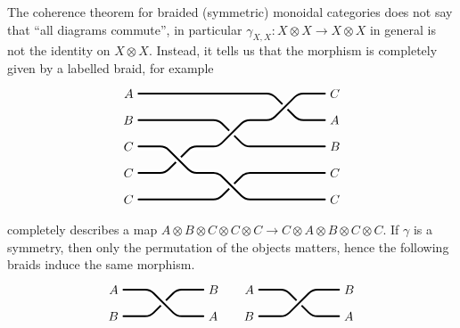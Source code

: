 \documentclass[a4paper,11pt,oneside,openany]{scrbook}
\begin{document}
\begin{rmk}
	The coherence theorem for braided (symmetric) monoidal categories does not say that ``all diagrams commute'', in particular $\gamma_{X,X}\colon X\otimes X\rightarrow X\otimes X$ in general is not the identity on $X\otimes X$. Instead, it tells us that the morphism is completely given by a labelled braid, for example
	\[
		\begin{tikzpicture}
			\draw[line width=0.5mm, cap=round, rounded corners] (0,3) -- node[pos=0, left] {$A$} (3.75,3) -- (4.5,2.25) -- (5.25,2.25) node[pos=1, right] {$A$}; %
			\draw[line width=0.5mm, cap=round, rounded corners] (0,2.25) -- node[pos=0, left] {$B$} (2.25,2.25) -- (3,1.5) -- (5.25,1.5) node[pos=1, right] {$B$}; %
			\draw[line width=2mm, cap=round, rounded corners, color=white] (0,.75) -- (.75,.75) -- (1.5,1.5) -- (2.25,1.5) -- (3,2.25) -- (3.75,2.25) -- (4.5,3) -- (5.25,3) ; %
			\draw[line width=0.5mm, cap=round, rounded corners] (0,.75) -- node[pos=0, left] {$C$} (.75,.75) -- (1.5,1.5) -- (2.25,1.5) -- (3,2.25) -- (3.75,2.25) -- (4.5,3) -- (5.25,3) node[pos=1, right] {$C$}; %
			\draw[line width=0.5mm, cap=round, rounded corners] (0,0) -- node[pos=0, left] {$C$} (2.25,0) -- (3,.75) -- (5.25,.75) node[pos=1, right] {$C$}; %
			\draw[line width=2mm, cap=round, rounded corners, color=white] (0,1.5) -- (.75,1.5) -- (1.5,.75) -- (2.25,.75) -- (3,0) -- (5.25,0); %
			\draw[line width=0.5mm, cap=round, rounded corners] (0,1.5) -- node[pos=0, left] {$C$} (.75,1.5) -- (1.5,.75) -- (2.25,.75) -- (3,0) -- (5.25,0) node[pos=1, right] {$C$}; %
		\end{tikzpicture}
	\]
	completely describes a map $A\otimes B\otimes C\otimes C\otimes C\rightarrow C\otimes A\otimes B\otimes C\otimes C$. If $\gamma$ is a symmetry, then only the permutation of the objects matters, hence the following braids induce the same morphism.
	\[
		\begin{tikzpicture}
			\draw[line width=0.5mm, cap=round, rounded corners] (0,0) -- node[pos=0, left] {$B$} (.75,0) -- (1.5,.75) -- (2.25,.75) node[pos=1, right] {$B$}; %
			\draw[line width=2mm, cap=round, rounded corners, color=white] (0,.75) -- node[pos=0, left] {$A$} (.75,.75) -- (1.5,0) -- (2.25,0) node[pos=1, right] {$A$}; %
			\draw[line width=0.5mm, cap=round, rounded corners] (0,.75) -- node[pos=0, left] {$A$} (.75,.75) -- (1.5,0) -- (2.25,0) node[pos=1, right] {$A$}; %
		\end{tikzpicture}
		\quad
		\begin{tikzpicture}
			\draw[line width=0.5mm, cap=round, rounded corners] (0,.75) -- node[pos=0, left] {$A$} (.75,.75) -- (1.5,0) -- (2.25,0) node[pos=1, right] {$A$}; %
			\draw[line width=2mm, cap=round, rounded corners, color=white] (0,0) -- node[pos=0, left] {$B$} (.75,0) -- (1.5,.75) -- (2.25,.75) node[pos=1, right] {$B$}; %
			\draw[line width=0.5mm, cap=round, rounded corners] (0,0) -- node[pos=0, left] {$B$} (.75,0) -- (1.5,.75) -- (2.25,.75) node[pos=1, right] {$B$}; %
		\end{tikzpicture}
	\]
\end{rmk}
\end{document}
